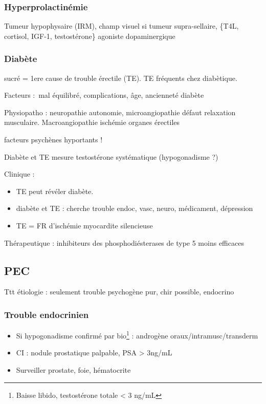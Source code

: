 \documentclass[11pt]{article}
\begin{document}
\subsubsection{Hyperprolactinémie}
\label{sec:org53e62e9}
Tumeur hypophysaire (IRM), champ visuel si tumeur
supra-sellaire, \{T4L, cortisol, IGF-1, testostérone\}
\thus agoniste dopaminergique

\subsubsection{Diabète}
\label{sec:orga5244bf}
sucré = 1ere cause de trouble érectile (TE). TE fréquents chez diabètique. 

Facteurs : mal équilibré, complications, âge, ancienneté diabète

Physiopatho : neuropathie autonomie, microangiopathie \thus défaut relaxation
musculaire. Macroangiopathie \thus ischémie organes érectiles

\danger facteurs psychènes hyportants !

Diabète et TE \thus mesure testostérone systématique (hypogonadisme ?)

Clinique : 
\begin{itemize}
\item TE peut révéler diabète.
\item diabète et TE : cherche trouble endoc, vasc, neuro, médicament, dépression
\item TE = FR d'ischémie myocardite silencieuse \danger
\end{itemize}

Thérapeutique : inhibiteurs des phosphodiésterases de type 5 moins efficaces

\subsection{PEC}
\label{sec:org25d3ba9}
Ttt étiologie : seulement trouble psychogène pur, chir possible, endocrino

\subsubsection{Trouble endocrinien}
\label{sec:org3f43a65}
\begin{itemize}
\item Si hypogonadisme confirmé par bio\footnote{Baisse libido, testostérone totale < 3 ng/mL} : androgène oraux/intramusc/transderm
\item CI : nodule prostatique palpable, PSA > 3ng/mL
\item Surveiller prostate, foie, hématocrite
\end{itemize}
\end{document}
